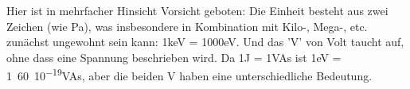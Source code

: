 Hier ist in mehrfacher Hinsicht Vorsicht geboten: Die Einheit besteht aus zwei Zeichen (wie Pa), was insbesondere in Kombination mit Kilo-, Mega-, etc. zunächst ungewohnt sein kann: \si{1}{keV} = \si{1000}{eV}. Und das 'V' von Volt taucht auf, ohne dass eine Spannung beschrieben wird. Da \si{1}{J} = \si{1}{VAs} ist \si{1}{eV} = \si{1.60 10^{-19}}{VAs}, aber die beiden V haben eine unterschiedliche Bedeutung.




\printbibliography[segment=\therefsegment,heading=subbibliography]
